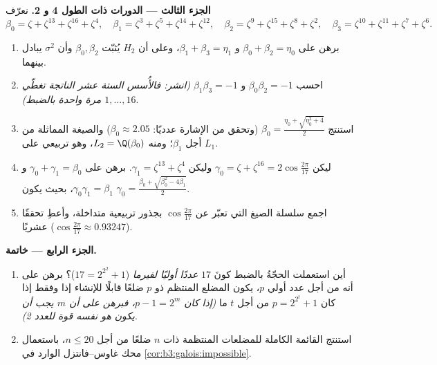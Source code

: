 \begin{problem}
\medskip
\noindent\textbf{الجزء الثالث --- الدورات ذات الطول 4 و 2.}
نعرّف
\[
\beta_0 = \zeta + \zeta^{13} + \zeta^{16} + \zeta^{4},\quad
\beta_1 = \zeta^3 + \zeta^5 + \zeta^{14} + \zeta^{12},\quad
\beta_2 = \zeta^9 + \zeta^{15} + \zeta^{8} + \zeta^{2},\quad
\beta_3 = \zeta^{10} + \zeta^{11} + \zeta^{7} + \zeta^{6}.
\]
\begin{enumerate}[resume]
  \item برهن على $\beta_0 + \beta_2 = \eta_0$ و $\beta_1 + \beta_3 =
        \eta_1$، وعلى أن $H_2$ يُثبّت $\beta_0, \beta_2$
        وأن $\sigma^2$ يبادل بينهما.
  \item احسب $\beta_0\beta_2 = -1$ و $\beta_1\beta_3 = -1$ \emph{(انشر: فالأُسس الستة عشر
        الناتجة تغطّي $1, \dots, 16$ مرة واحدة بالضبط)}.
  \item استنتج $\beta_0 = \frac{\eta_0 + \sqrt{\eta_0^2 + 4}}2$ (وتحقق من الإشارة عدديًا: $\beta_0 \approx 2.05$)
        والصيغة المماثلة من أجل $\beta_1$؛ ومنه $L_2 =
        \Q(\beta_0)$، وهو
        تربيعي على $L_1$.
  \item ليكن $\gamma_0 = \zeta + \zeta^{16} =
        2\cos\frac{2\pi}{17}$ وليكن $\gamma_1 = \zeta^{13} +
        \zeta^4$. برهن على $\gamma_0 + \gamma_1 = \beta_0$ و $\gamma_0\gamma_1 = \beta_1$،
        بحيث يكون $\gamma_0 =
        \frac{\beta_0 + \sqrt{\beta_0^2 - 4\beta_1}}2$.
  \item اجمع سلسلة الصيغ التي تعبّر عن $\cos\frac{2\pi}{17}$ بجذور تربيعية
        متداخلة، وأعطِ تحققًا عشريًا ($\cos\frac{2\pi}{17} \approx 0.93247$).
\end{enumerate}

\medskip
\noindent\textbf{الجزء الرابع --- خاتمة.}
\begin{enumerate}[resume]
  \item أين استعملت الحجّةُ بالضبط كونَ $17$ \emph{عددًا أوليًا
        لفيرما} ($17 = 2^{2^2} + 1$)؟ برهن على أنه من أجل عدد أولي $p$،
        يكون المضلع المنتظم ذو $p$ ضلعًا قابلًا للإنشاء إذا وفقط
        إذا كان $p
        = 2^{2^t} + 1$ من أجل $t$ ما \emph{(إذا كان
        $p - 1 = 2^m$، فبرهن على أن $m$ يجب أن يكون هو نفسه قوة
        للعدد 2)}.
  \item استنتج القائمة الكاملة للمضلعات المنتظمة ذات $n$ ضلعًا
         من أجل $n \leq 20$، باستعمال محك
        غاوس--فانتزل الوارد في \cref{cor:b3:galois:impossible}.
\end{enumerate}


\end{problem}
